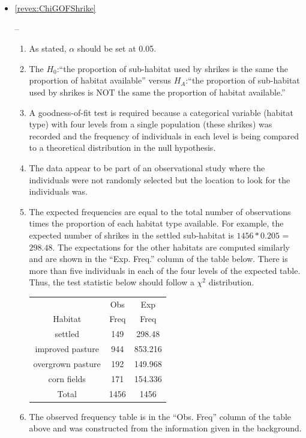 \documentclass[10pt,openany]{book}\usepackage[]{graphicx}\usepackage[]{color}
\begin{document}
\begin{itemize}
  \item \hypertarget{ans:ChiGOFShrike}{\ref{revex:ChiGOFShrike}} --
    \begin{enumerate}
      \item As stated, $\alpha$ should be set at 0.05.
      \item The $H_{0}$:``the proportion of sub-habitat used by shrikes is the same the proportion of habitat available'' versus $H_{A}$:``the proportion of sub-habitat used by shrikes is NOT the same the proportion of habitat available.''
      \item A goodness-of-fit test is required because a categorical variable (habitat type) with four levels from a single population (these shrikes) was recorded and the frequency of individuals in each level is being compared to a theoretical distribution in the null hypothesis.
      \item The data appear to be part of an observational study where the individuals were not randomly selected but the location to look for the individuals was.
      \item The expected frequencies are equal to the total number of observations times the proportion of each habitat type available.  For example, the expected number of shrikes in the settled sub-habitat is $1456*0.205$ = $298.48$.  The expectations for the other habitats are computed similarly and are shown in the ``Exp. Freq.'' column of the table below.  There is more than five individuals in each of the four levels of the expected table.  Thus, the test statistic below should follow a $\chi^{2}$ distribution.
        \begin{center}
          \begin{tabular}{ccc}
            \hline\hline
            & Obs & Exp \\
            Habitat & Freq & Freq \\
            \hline
            settled           & 149 & 298.48 \\
            improved pasture  & 944 & 853.216 \\
            overgrown pasture & 192 & 149.968 \\
            corn fields       & 171 & 154.336 \\
            \hline
            Total & 1456 & 1456 \\
            \hline\hline
          \end{tabular}
        \end{center}
      \item The observed frequency table is in the ``Obs. Freq'' column of the table above and was constructed from the information given in the background.

\end{enumerate}
\end{itemize}
\end{document}
